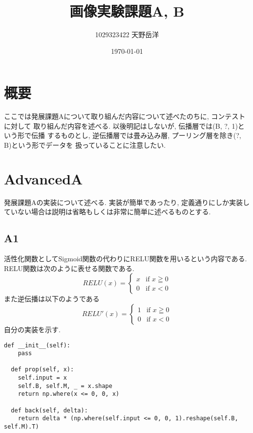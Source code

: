 \documentclass[a4paper,11pt]{jsarticle}
\begin{document}
\title{画像実験課題A, B}
\author{1029323422 天野岳洋}
\date{\today}
\maketitle
\clearpage

\section{概要}
ここでは発展課題Aについて取り組んだ内容について述べたのちに, コンテストに対して
取り組んだ内容を述べる. 以後明記はしないが, 伝播層では(B, ?, 1)という形で伝播
するものとし, 逆伝播層では畳み込み層, プーリング層を除き(?, B)という形でデータを
扱っていることに注意したい.
\section{AdvancedA}
発展課題Aの実装について述べる. 実装が簡単であったり, 
定義通りにしか実装していない場合は説明は省略もしくは非常に簡単に述べるものとする.
\subsection{A1}
活性化関数としてSigmoid関数の代わりにRELU関数を用いるという内容である.
RELU関数は次のように表せる関数である.
\begin{equation}
  RELU(x)=
  \begin{cases}
    x & \text{if $x \geqq 0$} \\
    0 & \text{if $x < 0$} 
  \end{cases}
\end{equation}
また逆伝播は以下のようである
\begin{equation}
  RELU'(x) =
  \begin{cases}
    1 & \text{if $x \geqq 0$} \\
    0 & \text{if $x < 0$}
  \end{cases}
\end{equation}
自分の実装を示す.
\begin{lstlisting}[caption=RELU]
  def __init__(self):
    pass

  def prop(self, x):
    self.input = x
    self.B, self.M, _ = x.shape
    return np.where(x <= 0, 0, x)
    
  def back(self, delta):
    return delta * (np.where(self.input <= 0, 0, 1).reshape(self.B, self.M).T)
\end{lstlisting}
\end{document}
